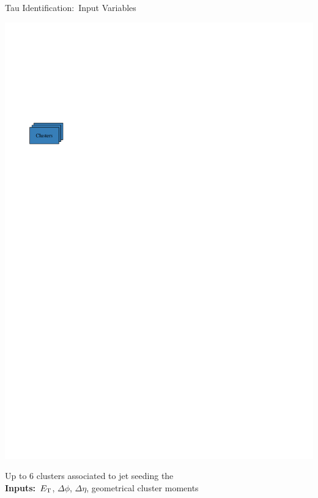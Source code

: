 \documentclass[11pt, xcolor={dvipsnames}, aspectratio=169, notes]{beamer}
\begin{document}
\begin{frame}{Tau Identification:\ Input Variables}
\begin{minipage}[c][2.2cm][c]{0.25\textwidth}
    \includegraphics[scale=1]{tauid/cluster_icon}
  \end{minipage}%
  \begin{minipage}[c][2.2cm][c]{0.75\textwidth}
    Up to 6 clusters associated to jet seeding the \tauhadvis\\[0.5\baselineskip]
    \textbf{Inputs:}\ $E_{\text{T}}$, $\Delta \phi$, $\Delta \eta$, geometrical cluster
    moments
  \end{minipage}
\end{frame}



\end{document}
